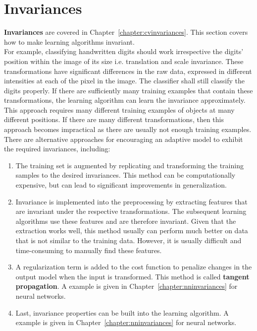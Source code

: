 \documentclass{report}
\begin{document}
\section{Invariances}
\label{chapter:invariances}
{\bf Invariances} are covered in Chapter~\ref{chapter:cvinvariances}. This section covers how to make learning algorithms invariant. \\
For example, classifying handwritten digits should work irrespective the digits' position within the image of its size i.e. translation and scale invariance.
These transformations have significant differences in the raw data, expressed in different intensities at each of the pixel in the image.
The classifier shall still classify the digits properly.
If there are sufficiently many training examples that contain these transformations, the learning algorithm can learn the invariance approximately.
This approach requires many different training examples of objects at many different positions.
If there are many different transformations, then this approach becomes impractical as there are usually not enough training examples. \\
There are alternative approaches for encouraging an adaptive model to exhibit the required invariances, including:
\begin{enumerate}
\item The training set is augmented by replicating and transforming the training samples to the desired invariances.
This method can be computationally expensive, but can lead to significant improvements in generalization.
\item Invariance is implemented into the preprocessing by extracting features that are invariant under the respective transformations.
The subsequent learning algorithms use these features and are therefore invariant.
Given that the extraction works well, this method usually can perform much better on data that is not similar to the training data.
However, it is usually difficult and time-consuming to manually find these features.
\item A regularization term is added to the cost function to penalize changes in the output model when the input is transformed. This method is called {\bf tangent propagation}.  A example is given in Chapter~\ref{chapter:nninvariances} for neural networks.
\item Last, invariance properties can be built into the learning algorithm. A example is given in Chapter~\ref{chapter:nninvariances} for neural networks.
\end{enumerate}
\end{document}
